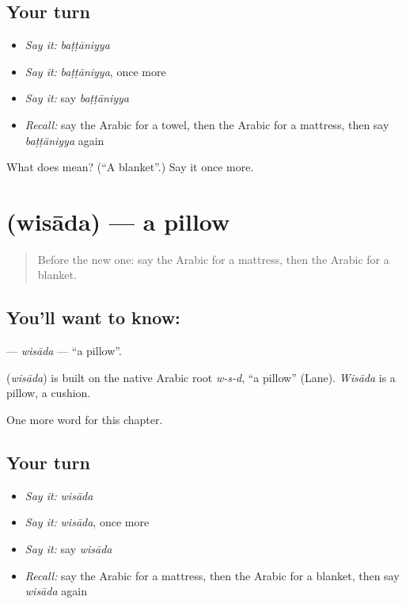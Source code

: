 \subsection*{Your turn}
\begin{itemize}
\raggedright
  \item \emph{Say it:} \emph{baṭṭāniyya}
  \item \emph{Say it:} \emph{baṭṭāniyya}, once more
  \item \emph{Say it:} say \emph{baṭṭāniyya}
  \item \emph{Recall:} say the Arabic for a towel, then the Arabic for a mattress, then say \emph{baṭṭāniyya} again
\end{itemize}

\begin{tcolorbox}[breakable,colback=teal!4,colframe=teal!35!black,title={Before you move on}]
What does  mean? (\textquotedblleft{}A blanket\textquotedblright{}.) Say it once more.
\end{tcolorbox}
\section[\texorpdfstring{\ar{وسادة} (wisāda)}{وسادة (wisāda)}]{ (wisāda) — a pillow}

\label{lesson:AR-C123-wisada}



\begin{quote}
Before the new one: say the Arabic for a mattress, then the Arabic for a blanket.
\end{quote}

\subsection*{You'll want to know: }
\textbf{} — \emph{wisāda} — \textquotedblleft{}a pillow\textquotedblright{}.

\begin{cousinweb}
\textbf{} (\emph{wisāda}) is built on the native Arabic root \emph{w-s-d}, \textquotedblleft{}a pillow\textquotedblright{} (Lane). \emph{Wisāda} is a pillow, a cushion.
\end{cousinweb}

\begin{grammarlens}[title={What you've built}]
One more word for this chapter.
\end{grammarlens}

\subsection*{Your turn}
\begin{itemize}
\raggedright
  \item \emph{Say it:} \emph{wisāda}
  \item \emph{Say it:} \emph{wisāda}, once more
  \item \emph{Say it:} say \emph{wisāda}
  \item \emph{Recall:} say the Arabic for a mattress, then the Arabic for a blanket, then say \emph{wisāda} again
\end{itemize}

